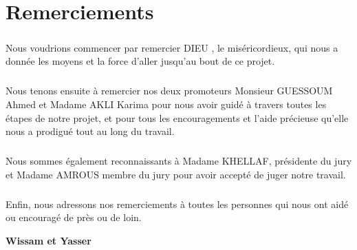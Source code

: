 \chapter*{Remerciements}    

\vspace{1.5cm}
\paragraph{}
Nous voudrions commencer par remercier DIEU , le miséricordieux, qui nous a donnée les moyens et la force d’aller jusqu’au bout de ce projet.
\paragraph{}
Nous tenons ensuite à remercier nos deux promoteurs Monsieur GUESSOUM Ahmed et Madame AKLI Karima pour nous avoir guidé à travers toutes les étapes de notre projet, et pour tous les encouragements et l’aide précieuse qu’elle nous a prodigué tout au long du travail.
\paragraph{}
Nous sommes également reconnaissants à Madame KHELLAF, présidente du jury et Madame AMROUS membre du jury pour avoir accepté de juger notre travail.
\paragraph{}
Enfin, nous adressons nos remerciements à toutes les personnes qui nous ont aidé ou encouragé
de près ou de loin.
\vspace{0.5cm}
\begin{center}
	\Large
	\hspace{8.5cm}
	\textbf{Wissam et Yasser}
\end{center}